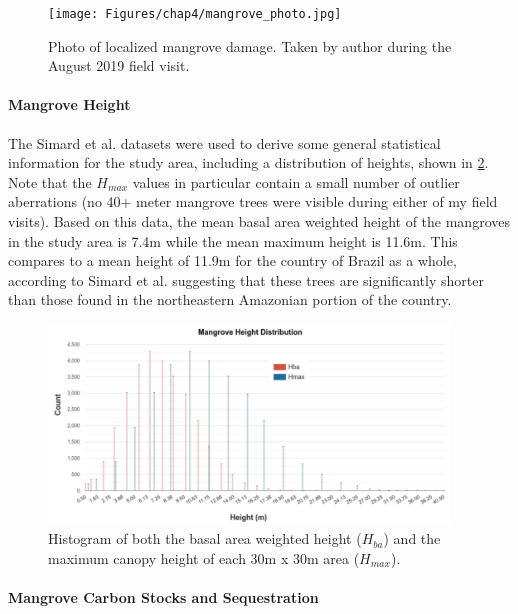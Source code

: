 \begin{figure}[H] 
\centering
\texttt{[image: Figures/chap4/mangrove\_photo.jpg]}
\caption[Photo of Localized Mangrove Damage]{Photo of localized mangrove damage. Taken by author during the August 2019 field visit.}
\label{fig:mangrove_photo}
\end{figure}


\paragraph{Mangrove Height} \leavevmode\newline

The Simard et al. datasets were used to derive some general statistical information for the study area, including a distribution of heights, shown in \ref{fig:height_histogram}. Note that the $H_{max}$ values in particular contain a small number of outlier aberrations (no 40+ meter mangrove trees were visible during either of my field visits). Based on this data, the mean basal area weighted height of the mangroves in the study area is 7.4m while the mean maximum height is 11.6m. This compares to a mean height of 11.9m for the country of Brazil as a whole, according to Simard et al. \cite{simardMangroveCanopyHeight2019} suggesting that these trees are significantly shorter than those found in the northeastern Amazonian portion of the country.

\begin{figure}[H] 
\centering
\includegraphics[width=0.95\textwidth]{Figures/chap4/height_histogram.png}
\caption[Histogram of Mangrove Height in Region]{Histogram of both the basal area weighted height ($H_{ba}$) and the maximum canopy height of each 30m x 30m area ($H_{max}$).}
\label{fig:height_histogram}
\end{figure}

\paragraph{Mangrove Carbon Stocks and Sequestration} \leavevmode\newline

